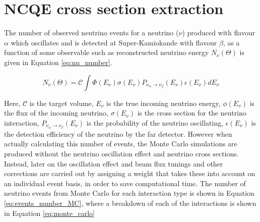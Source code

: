 \chapter{NCQE cross section extraction}
\label{chp:ncqe_xsec}

The number of observed neutrino events for a neutrino ($\nu$) produced with flavour $\alpha$ which oscillates and is detected at Super-Kamiokande with flavour $\beta$, as a function of some observable such as reconstructed neutrino energy $N_{\nu}(\Theta)$ is given in Equation \ref{eq:nu_number}.

\begin{equation}
    N_\nu(\Theta)=\mathcal{C} \int \Phi\left(E_\nu\right) \sigma\left(E_\nu\right) P_{\nu_\alpha \rightarrow \nu_\beta}\left(E_\nu\right) \epsilon\left(E_\nu\right) d E_\nu
\label{eq:nu_number}
\end{equation}

Here, $\mathcal{C}$ is the target volume, $E_{\nu}$ is the true incoming neutrino energy, $\phi(E_{\nu})$ is the flux of the incoming neutrino, $\sigma(E_{\nu})$ is the cross section for the neutrino interaction, $P_{\nu_\alpha \rightarrow \nu_\beta}(E_{\nu})$ is the probability of the neutrino oscillating, $\epsilon (E_{\nu})$ is the detection efficiency of the neutrino by the far detector. However when actually calculating this number of events, the Monte Carlo simulations are produced without the neutrino oscillation effect and neutrino cross sections. Instead, later on the oscillation effect and beam flux tunings and other corrections are carried out by assigning a weight that takes these into account on an individual event basis, in order to save computational time. The number of neutrino events from Monte Carlo for each interaction type is shown in Equation \ref{eq:events_number_MC}, where a breakdown of each of the interactions is shown in Equation \ref{eq:monte_carlo} 